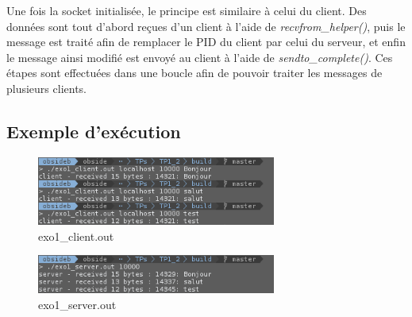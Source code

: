 Une fois la socket initialisée, le principe est similaire à celui du client. Des données sont tout d'abord reçues d'un client à l'aide de \emph{recvfrom\_helper()}, puis le message est traité afin de remplacer le PID du client par celui du serveur, et enfin le message ainsi modifié est envoyé au client à l'aide de \emph{sendto\_complete()}. Ces étapes sont effectuées dans une boucle afin de pouvoir traiter les messages de plusieurs clients.

\subsection{Exemple d'exécution}
\begin{figure}[h!]
	\centering
	\includegraphics[width=0.7\textwidth]{screenshots/ex1_client.png}
	\caption{exo1\_client.out}
\end{figure}

\begin{figure}[h!]
	\centering
	\includegraphics[width=0.7\textwidth]{screenshots/ex1_server.png}
	\caption{exo1\_server.out}
\end{figure}

